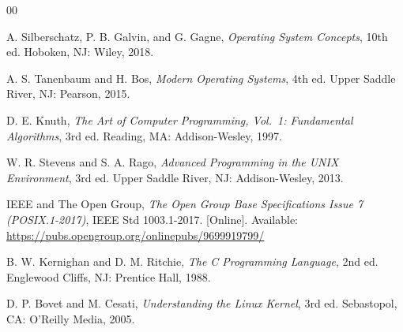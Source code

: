 \documentclass[conference]{IEEEtran}
\begin{document}
\begin{thebibliography}{00}

A. Silberschatz, P. B. Galvin, and G. Gagne,
\textit{Operating System Concepts}, 10th ed.
Hoboken, NJ: Wiley, 2018.

A. S. Tanenbaum and H. Bos,
\textit{Modern Operating Systems}, 4th ed.
Upper Saddle River, NJ: Pearson, 2015.

D. E. Knuth,
\textit{The Art of Computer Programming, Vol.\ 1: Fundamental Algorithms}, 3rd ed.
Reading, MA: Addison-Wesley, 1997.

W. R. Stevens and S. A. Rago,
\textit{Advanced Programming in the UNIX Environment}, 3rd ed.
Upper Saddle River, NJ: Addison-Wesley, 2013.

IEEE and The Open Group,
\textit{The Open Group Base Specifications Issue 7 (POSIX.1-2017)},
IEEE Std 1003.1-2017. [Online].
Available: \url{https://pubs.opengroup.org/onlinepubs/9699919799/}

B. W. Kernighan and D. M. Ritchie,
\textit{The C Programming Language}, 2nd ed.
Englewood Cliffs, NJ: Prentice Hall, 1988.

D. P. Bovet and M. Cesati,
\textit{Understanding the Linux Kernel}, 3rd ed.
Sebastopol, CA: O'Reilly Media, 2005.

\end{thebibliography}
\end{document}
